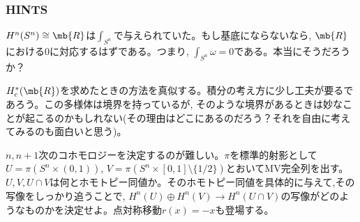 \subsubsection{HINTS}
{\small

\begin{hint}
$H^n(S^n)\cong \mb{R}$は$\int_{S^n}$で与えられていた。もし基底にならないなら, $\mb{R}$における0に対応するはずである。つまり, $\int_{S^n}\omega = 0$である。本当にそうだろうか？
\end{hint}
\begin{hint}
$H_{c}^{\ast}(\mb{R})$を求めたときの方法を真似する。積分の考え方に少し工夫が要るであろう。この多様体は境界を持っているが, そのような境界があるときは妙なことが起こるのかもしれない(その理由はどこにあるのだろう？それを自由に考えてみるのも面白いと思う)。
\end{hint}
\begin{hint}
$n,n+1$次のコホモロジーを決定するのが難しい。$\pi$を標準的射影として$U=\pi(S^n\times (0,1))$, $V=\pi(S^n\times [0,1]\setminus{\{ 1/2\}})$とおいてMV完全列を出す。$U,V,U\cap V$は何とホモトピー同値か。そのホモトピー同値を具体的に与えて,その写像をしっかり追うことで, $H^{n}(U)\oplus H^{n}(V)\to H^{n}(U\cap V)$の写像がどのようなものかを決定せよ。点対称移動$r(x) = -x$も登場する。
\end{hint}

}



